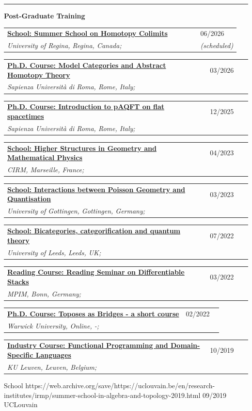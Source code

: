 \documentclass[a4paper]{article}
\newcommand{\block}[1]{\hrule \vspace{0.2cm} \textbf{\Large #1} \vspace{0.2cm}}
\newcommand{\longvoice}[8]{
	\begin{tabular}{p{0.83\linewidth} p{0.17\linewidth} }
		\textbf{\href{#3}{#2: #1}} & #4 
		\\ 
		\textit{#5, #6, #7;} & {\small\emph{#8}}
	\end{tabular}
	\vspace{.5em}
}
\begin{document}

	\block{Post-Graduate Training}

    
    \longvoice{Summer School on Homotopy Colimits}
        {School}
        {https://sites.google.com/view/reginahomotopy}
        {06/2026}
        {University of Regina}
        {Regina}
        {Canada}
        {(scheduled)}
    \longvoice{Model Categories and Abstract Homotopy Theory}
        {Ph.D. Course}
        {https://eugeniolandi.github.io/homotopy}
        {03/2026}
        {Sapienza Università di Roma}
        {Rome}
        {Italy}
        {}
    \longvoice{Introduction to pAQFT on flat spacetimes}
        {Ph.D. Course}
        {https://www.antoniomiti.it/teaching/aqft-2025/}
        {12/2025}
        {Sapienza Università di Roma}
        {Rome}
        {Italy}
        {}
    \longvoice{Higher Structures in Geometry and Mathematical Physics}
        {School}
        {https://conferences.cirm-math.fr/2697.html}
        {04/2023}
        {CIRM}
        {Marseille}
        {France}
        {}
    \longvoice{Interactions between Poisson Geometry and Quantisation}
        {School}
        {https://sites.google.com/view/poissonquantisation2023}
        {03/2023}
        {University of Gottingen}
        {Gottingen}
        {Germany}
        {}
    \longvoice{Bicategories, categorification and quantum theory}
        {School}
        {https://conferences.leeds.ac.uk/bcqt2022/}
        {07/2022}
        {University of Leeds}
        {Leeds}
        {UK}
        {}
	\longvoice{Reading Seminar on Differentiable Stacks}
		{Reading Course}
		{https://www.dropbox.com/s/a9tmw4g8m58ymkf/2203-Bonn-StackReadingSeminar.pdf?dl=0}
		{03/2022}
		{MPIM}
		{Bonn}
		{Germany}
		{}
	\longvoice{Toposes as Bridges - a short course}
		{Ph.D. Course}
		{https://warwick.ac.uk/fac/sci/maths/research/events/events2021-22/toposesasbridges/}
		{02/2022}
		{Warwick University}
		{Online}
		{-}
		{}
	\longvoice{Functional Programming and Domain-Specific Languages}
		{Industry Course}
		{https://dtai.cs.kuleuven.be/events/fpcourse/}
		{10/2019}
		{KU Leuven}
		{Leuven}
		{Belgium}
		{}
		{School}
		{https://web.archive.org/save/https://uclouvain.be/en/research-institutes/irmp/summer-school-in-algebra-and-topology-2019.html}
		{09/2019}
		{UCLouvain}
\end{document}
